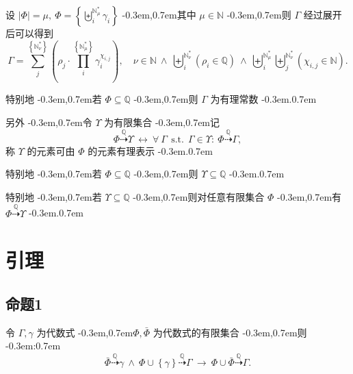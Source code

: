 \documentclass{article}
\newcommand\BrSetU[1]{\Set{\MathPartialSetU{#1}}}
\newcommand\InSetN[1]{\InSet{#1}{\MathSetN}}
\newcommand\InSetQ[1]{\InSet{#1}{\MathSetQ}}
\newcommand\MathPartialSetU[1]{\mathbb{N}^{\ast}_{#1}}
\newcommand\MathSetN{\mathbb{N}}
\newcommand\MathSetQ{\mathbb{Q}}
\newcommand\NormalSeqOfU[3]{\SeqOfU{#1}{#2} #3_{#1}}
\newcommand\ProdOfU[2]{\prod_{#1}^{\BrSetU{#2}}}
\newcommand\SeqSetU[3]{\Set{\NormalSeqOfU{#1}{#2}{#3}}}
\newcommand\SeqOfUInSetQ[3]{\SeqOfU{#1}{#2} \Bracket{\InSetQ{#3_{#1}}}}
\newcommand\SeqOfU[2]{\Seq{#1}{\MathPartialSetU{#2}}}
\newcommand\SumOfU[2]{\sum_{#1}^{\BrSetU{#2}}}
\newcommand\Abs[1]{\left| #1 \right|}
\newcommand\Appose{\Comma}
\newcommand\Bracket[1]{\left( #1 \right)}
\newcommand\BracketBig[1]{\left\{ #1 \right\}}
\newcommand\Colon{:}
\newcommand\Comma{,}
\newcommand\CommaAnd{\Space{\Comma}}
\newcommand\CommaSub{\Comma}
\newcommand\Domain[1]{\DomainComma \quad #1}
\newcommand\DomainAnd{\LogicAnd}
\newcommand\DomainComma{\Comma}
\newcommand\Equivalent{\Logic{\leftrightarrow}}
\newcommand\ForAll[3]{\Satisfy{\forall}{#1}{#2}{#3}}
\newcommand\Implies{\Logic{\rightarrow}}
\newcommand\InSet[2]{#1 \in #2}
\newcommand\Logic[1]{\ #1\ }
\newcommand\LogicAnd{\Logic{\wedge}}
\newcommand\MultiSub[2]{#1 \CommaSub #2}
\newcommand\RationalEx{\stackrel{\MathSetQ}{\dashrightarrow}}
\newcommand\Satisfy[4]{\Space{#1} #2 \SuchThat #3 \Space{\Colon} #4}
\newcommand\Seq[2]{\biguplus_{#1}^{#2}}
\newcommand\Set[1]{\BracketBig{#1}}
\newcommand\Space[1]{#1\ }
\newcommand\SubSetQ[1]{#1 \subseteq \MathSetQ}
\newcommand\SuchThat{\Logic{\Logic{\text{s.t.}}}}
\newcommand\EqEndComma{\Comma}
\newcommand\EqEndPeriod{.}
\newcommand\Proposition[1]{命题#1}
\newcommand\TextColon{\TextPunctuation{\Colon}}
\newcommand\TextComma{\TextPunctuation{\Comma}}
\newcommand\TextPeriod{\TextPunctuation{.}}
\newcommand\TextPunctuation[1]{\kern -0.3em#1\kern 0.7em}
\begin{document}
	设 $\Abs{\Phi} = \mu \CommaAnd \Phi = \SeqSetU{i}{\mu}{\gamma}$ \TextComma 其中 $\InSetN{\mu}$ \TextComma 则 $\Gamma$ 经过展开后可以得到
	\begin{equation*}
	\Gamma = \SumOfU{j}{\nu} \Bracket{\rho_{j} \cdot \ProdOfU{i}{\mu} \gamma_{i}^{\chi_{\MultiSub{i}{j}}}} \Domain{\InSetN{\nu} \DomainAnd \SeqOfUInSetQ{i}{\nu}{\rho} \DomainAnd \SeqOfU{i}{\mu} \SeqOfU{j}{\nu} \Bracket{\InSetN{\chi_{\MultiSub{i}{j}}}}} \EqEndPeriod
	\end{equation*}
	
	特别地 \TextComma 若 $\SubSetQ{\Phi}$ \TextComma 则 $\Gamma$ 为有理常数 \TextPeriod
	
	另外 \TextComma 令 $\Upsilon$ 为有限集合 \TextComma 记
	\begin{equation*}
	\Phi \RationalEx \Upsilon \Equivalent \ForAll{\Gamma}{\InSet{\Gamma}{\Upsilon}}{\Phi \RationalEx \Gamma} \EqEndComma
	\end{equation*}
	称 $\Upsilon$ 的元素可由 $\Phi$ 的元素有理表示 \TextPeriod
	
	特别地 \TextComma 若 $\SubSetQ{\Phi}$ \TextComma 则 $\SubSetQ{\Upsilon}$ \TextPeriod
	
	特别地 \TextComma 若 $\SubSetQ{\Upsilon}$ \TextComma 则对任意有限集合 $\Phi$ \TextComma 有 $\Phi \RationalEx \Upsilon$ \TextPeriod
	
	
	\section{引理}
	\subsection{\Proposition{1}} \label{sec:3.1}
	令 $\Gamma \Appose \gamma$ 为代数式 \TextComma $\Phi \Appose \bar{\Phi}$ 为代数式的有限集合 \TextComma 则 \TextColon
	\begin{equation*}
	\bar{\Phi} \RationalEx \gamma \LogicAnd \Phi \cup \Set{\gamma} \RationalEx \Gamma \Implies \Phi \cup \bar{\Phi} \RationalEx \Gamma \EqEndPeriod
	\end{equation*}
	
\end{document}
